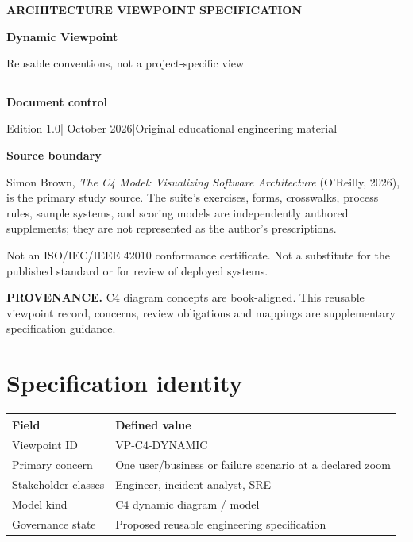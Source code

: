 \documentclass[10pt,letterpaper]{article}
\newcommand{\SourceNote}[1]{\par\smallskip\noindent\colorbox{C4Light}{\parbox{0.94\linewidth}{\footnotesize\textbf{PROVENANCE.} #1}}\par\medskip}
\newcommand{\DocStart}[3]{%
\begin{document}
\begin{titlepage}
\renewcommand{\thepage}{title-\arabic{page}}
\vspace*{0.55in}
{\sffamily\bfseries\small\color{C4Teal}#1}\par\vspace{0.24in}
{\sffamily\bfseries\fontsize{26}{31}\selectfont\color{C4Navy}#2}\par\vspace{0.18in}
{\large\color{C4Gray}#3}\par\vspace{0.4in}
\textcolor{C4Teal}{\rule{\linewidth}{1.15pt}}\par\vspace{0.24in}
\textbf{Document control}\par
Edition 1.0\quad|\quad 30 October 2026\quad|\quad Original educational engineering material\par
\vspace{0.17in}
\textbf{Source boundary}\par
Simon Brown, \emph{The C4 Model: Visualizing Software Architecture} (O'Reilly, 2026), is the primary study source. The suite's exercises, forms, crosswalks, process rules, sample systems, and scoring models are independently authored supplements; they are not represented as the author's prescriptions.\par
\vfill
{\small\color{C4Gray}Not an ISO/IEC/IEEE 42010 conformance certificate. Not a substitute for the published standard or for review of deployed systems.}\par
\end{titlepage}
}
\DocStart{ARCHITECTURE VIEWPOINT SPECIFICATION}{Dynamic Viewpoint}{Reusable conventions, not a project-specific view}
\SourceNote{C4 diagram concepts are book-aligned. This reusable viewpoint record, concerns, review obligations and mappings are supplementary specification guidance.}
\section{Specification identity}
\begin{tabularx}{\linewidth}{@{}YY@{}}\toprule
\textbf{Field} & \textbf{Defined value} \\ \midrule
Viewpoint ID & VP-C4-DYNAMIC \\
Primary concern & One user/business or failure scenario at a declared zoom \\
Stakeholder classes & Engineer, incident analyst, SRE \\
Model kind & C4 dynamic diagram / model \\
Governance state & Proposed reusable engineering specification \\
\bottomrule\end{tabularx}
\end{document}
